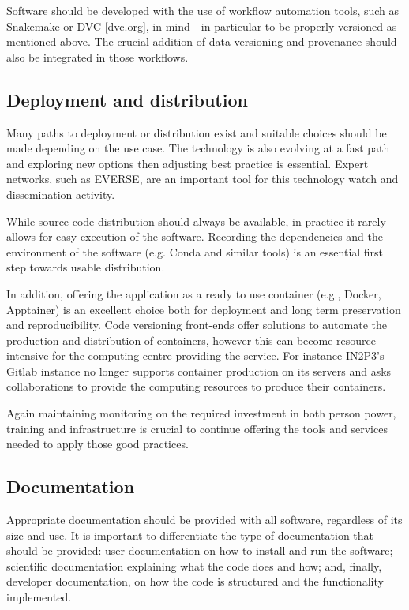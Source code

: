 Software should be developed with the use of workflow automation tools, such as Snakemake or DVC [dvc.org], in mind - in particular to be properly versioned as mentioned above. The crucial addition of data versioning and provenance should also be integrated in those workflows. 

\subsection{Deployment and distribution}

Many paths to deployment or distribution exist and suitable choices should be made depending on the use case. The technology is also evolving at a fast path and exploring new options then adjusting best practice is essential. Expert networks, such as EVERSE, are an important tool for this technology watch and dissemination activity. 

While source code distribution should always be available, in practice it rarely allows for easy execution of the software. Recording the dependencies and the environment of the software (e.g. Conda and similar tools) is an essential first step towards usable distribution.

In addition, offering the application as a ready to use container (e.g., Docker, Apptainer) is an excellent choice both for deployment and long term preservation and reproducibility. Code versioning front-ends offer solutions to automate the production and distribution of containers, however this can become resource-intensive for the computing centre providing the service. For instance IN2P3’s Gitlab instance no longer supports container production on its servers and asks collaborations to provide the computing resources to produce their containers.

Again maintaining monitoring on the required  investment in both person power, training and infrastructure is crucial to continue offering the tools and services needed to apply those good practices.


\subsection{Documentation}

Appropriate documentation should be provided with all software, regardless of its size and use. It is important to differentiate the type of documentation that should be provided: user documentation on how to install and run the software; scientific documentation explaining what the code does and how; and, finally, developer documentation, on how the code is structured and the functionality implemented.

